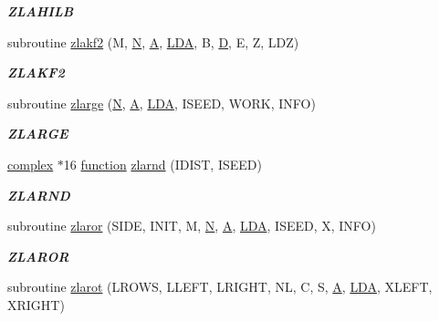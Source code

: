 \begin{DoxyCompactItemize}
\begin{DoxyCompactList}\small\item\em {\bfseries Z\+L\+A\+H\+I\+L\+B} \end{DoxyCompactList}\item 
subroutine \hyperlink{group__complex16__matgen_ga7fb408e40d1f849afc88d6defd28d1f3}{zlakf2} (M, \hyperlink{polmisc_8c_a0240ac851181b84ac374872dc5434ee4}{N}, \hyperlink{classA}{A}, \hyperlink{example__user_8c_ae946da542ce0db94dced19b2ecefd1aa}{L\+D\+A}, B, \hyperlink{odrpack_8h_a7dae6ea403d00f3687f24a874e67d139}{D}, E, Z, L\+D\+Z)
\begin{DoxyCompactList}\small\item\em {\bfseries Z\+L\+A\+K\+F2} \end{DoxyCompactList}\item 
subroutine \hyperlink{group__complex16__matgen_ga226bb7e1cb4fe29016ca7af04199cffa}{zlarge} (\hyperlink{polmisc_8c_a0240ac851181b84ac374872dc5434ee4}{N}, \hyperlink{classA}{A}, \hyperlink{example__user_8c_ae946da542ce0db94dced19b2ecefd1aa}{L\+D\+A}, I\+S\+E\+E\+D, W\+O\+R\+K, I\+N\+F\+O)
\begin{DoxyCompactList}\small\item\em {\bfseries Z\+L\+A\+R\+G\+E} \end{DoxyCompactList}\item 
\hyperlink{structcomplex}{complex} $\ast$16 \hyperlink{afunc_8m_a7b5e596df91eadea6c537c0825e894a7}{function} \hyperlink{group__complex16__matgen_gab277474330345f4e2d3cfb651235fffb}{zlarnd} (I\+D\+I\+S\+T, I\+S\+E\+E\+D)
\begin{DoxyCompactList}\small\item\em {\bfseries Z\+L\+A\+R\+N\+D} \end{DoxyCompactList}\item 
subroutine \hyperlink{group__complex16__matgen_ga447d8ff2c1016669865223cbb1ab5ca7}{zlaror} (S\+I\+D\+E, I\+N\+I\+T, M, \hyperlink{polmisc_8c_a0240ac851181b84ac374872dc5434ee4}{N}, \hyperlink{classA}{A}, \hyperlink{example__user_8c_ae946da542ce0db94dced19b2ecefd1aa}{L\+D\+A}, I\+S\+E\+E\+D, X, I\+N\+F\+O)
\begin{DoxyCompactList}\small\item\em {\bfseries Z\+L\+A\+R\+O\+R} \end{DoxyCompactList}\item 
subroutine \hyperlink{group__complex16__matgen_ga16798aa3e7a6617eca929b34c61eb0c1}{zlarot} (L\+R\+O\+W\+S, L\+L\+E\+F\+T, L\+R\+I\+G\+H\+T, N\+L, C, S, \hyperlink{classA}{A}, \hyperlink{example__user_8c_ae946da542ce0db94dced19b2ecefd1aa}{L\+D\+A}, X\+L\+E\+F\+T, X\+R\+I\+G\+H\+T)

\end{DoxyCompactItemize}
